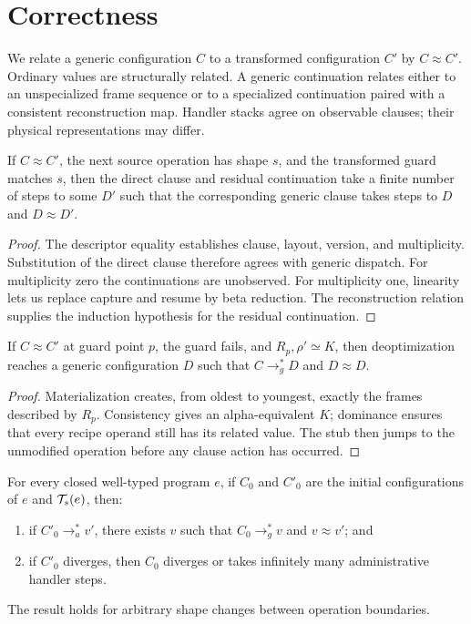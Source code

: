 \section{Correctness}
\label{sec:correctness}

We relate a generic configuration $C$ to a transformed configuration $C'$ by
$C\approx C'$. Ordinary values are structurally related. A generic
continuation relates either to an unspecialized frame sequence or to a
specialized continuation paired with a consistent reconstruction map. Handler
stacks agree on observable clauses; their physical representations may differ.

\begin{lemma}
If $C\approx C'$, the next source operation has shape $s$, and the transformed
guard matches $s$, then the direct clause and residual continuation take a
finite number of steps to some $D'$ such that the corresponding generic clause
takes steps to $D$ and $D\approx D'$.
\end{lemma}

\begin{proof}
The descriptor equality establishes clause, layout, version, and multiplicity.
Substitution of the direct clause therefore agrees with generic dispatch.
For multiplicity zero the continuations are unobserved. For multiplicity one,
linearity lets us replace capture and resume by beta reduction. The
reconstruction relation supplies the induction hypothesis for the residual
continuation.
\end{proof}

\begin{lemma}
If $C\approx C'$ at guard point $p$, the guard fails, and
$R_p,\rho'\simeq K$, then deoptimization reaches a generic configuration $D$
such that $C\longrightarrow_g^{*}D$ and $D\approx D$.
\end{lemma}

\begin{proof}
Materialization creates, from oldest to youngest, exactly the frames described
by $R_p$. Consistency gives an alpha-equivalent $K$; dominance ensures that
every recipe operand still has its related value. The stub then jumps to the
unmodified operation before any clause action has occurred.
\end{proof}

\begin{theorem}
For every closed well-typed program $e$, if $C_0$ and $C'_0$ are the initial
configurations of $e$ and $\mathcal{T}_s(e)$, then:
\begin{enumerate}
  \item if $C'_0\longrightarrow_a^{*}v'$, there exists $v$ such that
        $C_0\longrightarrow_g^{*}v$ and $v\approx v'$; and
  \item if $C'_0$ diverges, then $C_0$ diverges or takes infinitely many
        administrative handler steps.
\end{enumerate}
The result holds for arbitrary shape changes between operation boundaries.
\end{theorem}

